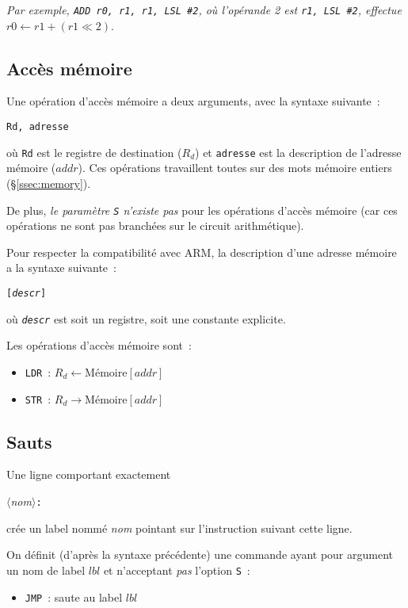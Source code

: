 \documentclass[11pt,a4paper]{article}
\begin{document}
\noindent\textit{Par exemple, \texttt{ADD r0, r1, r1, LSL \#{}2}, où l'opérande 2 est \texttt{r1, LSL \#{}2}, effectue} ${r0 \leftarrow r1 + (r1 \ll 2)}$.

\subsection{Accès mémoire}

Une opération d'accès mémoire a deux arguments, avec la syntaxe suivante~:

\begin{center}\texttt{Rd, adresse}\end{center}

où \texttt{Rd} est le registre de destination ($R_d$) et \texttt{adresse} est la description de l'adresse mémoire ($addr$). Ces opérations travaillent toutes sur des mots mémoire entiers (§\ref{ssec:memory}).

De plus, \emph{le paramètre \texttt{S} n'existe pas} pour les opérations d'accès mémoire (car ces opérations ne sont pas branchées sur le circuit arithmétique).

Pour respecter la compatibilité avec ARM, la description d'une adresse mémoire a la syntaxe suivante~:
\begin{center}\texttt{[\textit{descr}]}\end{center}
où \texttt{\textit{descr}} est soit un registre, soit une constante explicite.

Les opérations d'accès mémoire sont~:

\begin{itemize}
\item \texttt{LDR}~: $R_d \leftarrow  \text{Mémoire}[addr]$
\item \texttt{STR}~: $R_d \rightarrow \text{Mémoire}[addr]$
\end{itemize}

\subsection{Sauts}

Une ligne comportant exactement
\begin{center}\textit{$\langle$nom$\rangle$}\texttt{:}\end{center}
\noindent{}crée un label nommé \textit{nom} pointant sur l'instruction suivant cette ligne.

On définit (d'après la syntaxe précédente) une commande ayant pour argument un nom de label $lbl$ et n'acceptant \emph{pas} l'option \texttt{S}~:
\begin{itemize}
\item \texttt{JMP}~: saute au label $lbl$
\end{itemize}
\end{document}
